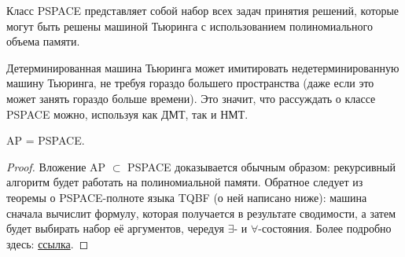     
    \begin{Def}
        Класс PSPACE представляет собой набор всех задач принятия решений, которые могут быть решены машиной Тьюринга с использованием полиномиального объема памяти.
    \end{Def}
    \begin{Rem}
        Детерминированная машина Тьюринга может имитировать недетерминированную машину Тьюринга, не требуя гораздо большего пространства (даже если это может занять гораздо больше времени). Это значит, что рассуждать о классе PSPACE можно, используя как ДМТ, так и НМТ.
    \end{Rem}
    \begin{Thm}
        AP = PSPACE.
    \end{Thm}
    \begin{proof}
        Вложение AP $\subset$ PSPACE доказывается обычным образом: рекурсивный алгоритм будет работать на полиномиальной памяти. Обратное следует из теоремы о PSPACE-полноте языка TQBF (о ней написано ниже): машина сначала вычислит формулу, которая получается в результате сводимости, а затем будет выбирать набор её аргументов, чередуя $\exists$- и $\forall$-состояния.
        Более подробно здесь: \href{http://ru.discrete-mathematics.org/fall2017/3/complexity/compl-book.pdf}{ссылка}.
    \end{proof} 

    

